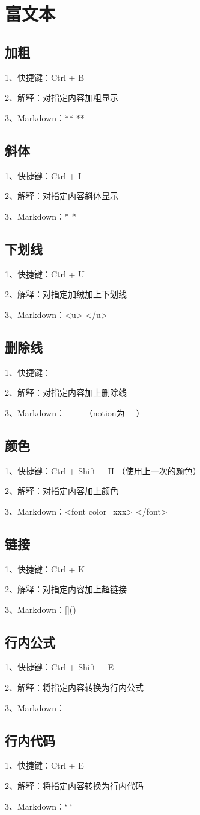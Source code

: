 \chapter{富文本}

\section{加粗}

1、快捷键：Ctrl + B

2、解释：对指定内容加粗显示

3、Markdown：** **

\section{斜体}

1、快捷键：Ctrl + I

2、解释：对指定内容斜体显示

3、Markdown：* *

\section{下划线}

1、快捷键：Ctrl + U

2、解释：对指定加绒加上下划线

3、Markdown：<u> </u>

\section{删除线}

1、快捷键：

2、解释：对指定内容加上删除线

3、Markdown：~~ ~~（notion为~ ~）

\section{颜色}

1、快捷键：Ctrl + Shift + H （使用上一次的颜色）

2、解释：对指定内容加上颜色

3、Markdown：<font color=xxx> </font>

\section{链接}

1、快捷键：Ctrl + K

2、解释：对指定内容加上超链接

3、Markdown：[]()

\section{行内公式}

1、快捷键：Ctrl + Shift + E

2、解释：将指定内容转换为行内公式

3、Markdown：$ $

\section{行内代码}

1、快捷键：Ctrl + E

2、解释：将指定内容转换为行内代码

3、Markdown：`  `

